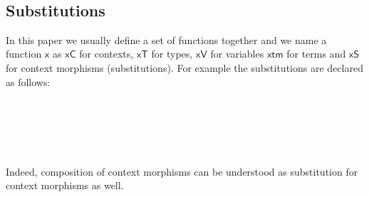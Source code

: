 \documentclass{sig-alternate}
\begin{document}
{\begin{code}
\\
\>[0]\<[8]%
\>[8]\AgdaSymbol{(} \AgdaSymbol{:} \AgdaSymbol{\{} \AgdaSymbol{:}  \AgdaSymbol{\}}      \AgdaSymbol{(} \AgdaSymbol{))}  \<[45]%
\>[45]\<%
\\
\>[0]\<[8]%
\>[8]   \<[14]%
\>[14]\<%
\\
\>[0]\<[6]%
\>[6]     \<%
\\
\>  \AgdaSymbol{(} \AgdaSymbol{\_)} \AgdaSymbol{=}  \AgdaSymbol{\_}\<%
\\
%
\\
\>\<\end{code}
}


\subsection{Substitutions}

In this paper we usually define a set of functions together and
we name a function $\mathsf{x}$ as $\mathsf{xC}$ for contexts, $\mathsf{xT}$ for types, $\mathsf{xV}$ for
variables $\mathsf{xtm}$ for terms and $\mathsf{xS}$ for context morphisms (substitutions). For example
the substitutions are declared as follows:

\begin{code}\>\<%
\\
\> \<[8]%
\>[8]\AgdaSymbol{:}  \AgdaSymbol{\}}          \<%
\\
\> \<[8]%
\>[8]\AgdaSymbol{:}   \AgdaSymbol{\}}     \AgdaSymbol{(} \AgdaSymbol{:}   \AgdaSymbol{)}   \AgdaSymbol{(} \AgdaFunction{[}  \AgdaFunction{]T}\AgdaSymbol{)}\<%
\\
\> \<[8]%
\>[8]\AgdaSymbol{:}   \AgdaSymbol{\}}     \AgdaSymbol{(} \AgdaSymbol{:}   \AgdaSymbol{)}   \AgdaSymbol{(} \AgdaFunction{[}  \AgdaFunction{]T}\AgdaSymbol{)} \<[59]%
\>[59]\<%
\\
\>\<\end{code}
Indeed, composition of context morphisms can be understood as substitution for context morphisms as well.
\end{document}
